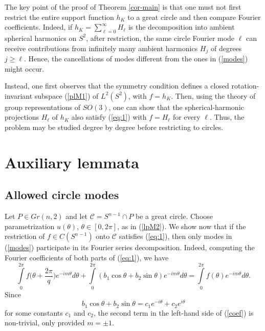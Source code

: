 \documentclass[11pt]{article}
\theoremstyle{definition}
\begin{document}
The key point of the proof of Theorem \ref{cor-main} is that 
one must not first restrict the entire support function $h_K$  to a great
circle and then compare Fourier coefficients. Indeed, if $h_K=\sum\limits_{\ell=0}^{\infty}H_\ell$ is the decomposition into ambient spherical harmonics on $S^2$, after restriction, the same circle
Fourier mode $\ell$ can receive contributions from infinitely many ambient harmonics  $H_j$ of degrees $j\ge \ell$. Hence, the cancellations of modes different from the ones in (\ref{modes}) might occur.

Instead, one first observes that the symmetry condition defines a closed rotation-invariant
subspace (\ref{plM1}) of \(L^2(S^2)\), with $f=h_K$. Then, using the theory of group representations of  $SO(3)$, one can show  that the spherical-harmonic projections $H_\ell$ of  $h_K$ 
  also satisfy (\ref{eq:1}) with $f=H_\ell$  for every $\ell$. Thus, the problem may be studied
degree by degree before restricting to circles.







\section{Auxiliary lemmata}



\subsection{Allowed circle modes}

Let $P\in Gr(n,2)$ and let \({\mathcal C}=S^{n-1}\cap P\) be a great circle. Choose  parametrization $u(\theta)$, $\theta\in [0,2\pi]$, as in (\ref{lpM2}). We show now  that  if the restriction of $f\in C(S^{n-1})$ onto ${\mathcal C}$ satisfies (\ref{eq:1}), then only modes in (\ref{modes}) participate in its Fourier series decomposition.
Indeed, computing the Fourier coefficients of both parts of (\ref{eq:1}), we have
\begin{equation}\label{coef}
\int\limits_0^{2\pi}f\Big(\theta+\frac{2\pi}{q}\Big)e^{-im\theta}d\theta+\int\limits_0^{2\pi}(b_1\cos\theta+b_2\sin\theta)e^{-im\theta}d\theta=\int\limits_0^{2\pi}f(\theta) e^{-im\theta}d\theta.
\end{equation}
Since
$$
b_1\cos\theta+b_2\sin\theta=c_1e^{-i\theta}+c_2e^{i\theta}
$$
for some constants $c_1$ and $c_2$, the second term in the left-hand side  of (\ref{coef})  is non-trivial, only provided $m= \pm 1$.
\end{document}
